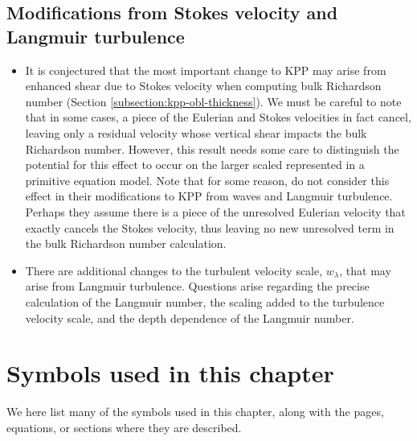 \subsection{Modifications from Stokes velocity and Langmuir
  turbulence}
\label{subsection:stokes-langmuir-kpp}

\begin{itemize}

\item It is conjectured that the most important change to KPP may
  arise from enhanced shear due to Stokes velocity when computing bulk
  Richardson number (Section \ref{subsection:kpp-obl-thickness}).  We
  must be careful to note that in some cases, a piece of the Eulerian
  and Stokes velocities in fact cancel, leaving only a residual
  velocity whose vertical shear impacts the bulk Richardson number.
  However, this result needs some care to distinguish the potential
  for this effect to occur on the larger scaled represented in a
  primitive equation model.  Note that for some reason,
  \cite{Smyth_etal2002} do not consider this effect in their
  modifications to KPP from waves and Langmuir turbulence.  Perhaps
  they assume there is a piece of the unresolved Eulerian velocity
  that exactly cancels the Stokes velocity, thus leaving no new
  unresolved term in the bulk Richardson number calculation.

\item There are additional changes to the turbulent velocity scale,
  $w_{\lambda}$, that may arise from Langmuir turbulence.  Questions
  arise regarding the precise calculation of the Langmuir number, the
  scaling added to the turbulence velocity scale, and the depth
  dependence of the Langmuir number.   

\end{itemize}



\section{Symbols used in this chapter}
\label{section:list-of-symbols}

We here list many of the symbols used in this chapter, along with the
pages, equations, or sections where they are described.


\subsection*{}


